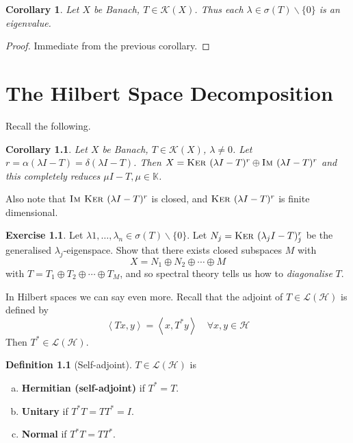 \documentclass[10pt, oneside, reqno]{amsbook}
\theoremstyle{plain}%
\newtheorem*{cor}{Corollary}
\theoremstyle{definition}
\newtheorem{defn}[thm]{Definition}
\newtheorem{exer}[thm]{Exercise}
\theoremstyle{remark}
\newcommand{\K}{\mathbb{K}}
\newcommand{\iprod}[1]{\left\langle #1 \right\rangle}
\newcommand{\im}{\textsc{Im\ }}
\renewcommand{\ker}{\textsc{Ker\ }}
\begin{document}
\begin{cor}
    Let $X$ be Banach, $T \in \mathcal K(X)$.  Thus each $\lambda \in \sigma(T) \backslash \{ 0 \}$ is an eigenvalue.  
\end{cor}
\begin{proof}
    Immediate from the previous corollary.
\end{proof}




\chapter{The Hilbert Space Decomposition}

Recall the following.
\begin{cor}
    Let $X$ be Banach, $T \in \mathcal K(X)$, $\lambda \neq 0$.  Let $r = \alpha(\lambda I - T) = \delta(\lambda I - T)$.  Then $X = \ker(\lambda I - T)^r \oplus \im(\lambda I - T)^r$ and this completely reduces $\mu I - T, \mu \in \K$.
\end{cor}

Also note that $\im \ker(\lambda I - T)^r$ is closed, and $\ker (\lambda I - T)^r$ is finite dimensional.  
\begin{exer}
    Let $\lambda 1, \dots, \lambda_n \in \sigma(T) \backslash \{ 0 \}$.  Let $N_j = \ker(\lambda_j I - T)^r_j$ be the generalised $\lambda_j$-eigenspace.  Show that there exists closed subspaces $M$ with \[
        X = N_1 \oplus N_2 \oplus \cdots \oplus M
    \] with $T = T_1 \oplus T_2 \oplus \cdots \oplus T_M $, and so spectral theory tells us how to \emph{diagonalise} $T$.
\end{exer} 

In Hilbert spaces we can say even more.  Recall that the adjoint of $T \in \mathcal L(\mathcal H)$ is defined by \[
    \iprod{Tx, y} = \iprod{x, T^* y} \quad \forall x, y \in \mathcal H
\]  Then $T^* \in \mathcal L(\mathcal H)$.  
\begin{defn}[Self-adjoint]
$T \in \mathcal L(\mathcal H)$ is \begin{enumerate}[(a)]
    \item \textbf{Hermitian (self-adjoint)} if $T^* = T$.
    \item \textbf{Unitary} if $T^* T = T T^* = I$.  
    \item \textbf{Normal} if $T^* T = T T^*$.  
\end{enumerate}
\end{defn}
\end{document}
